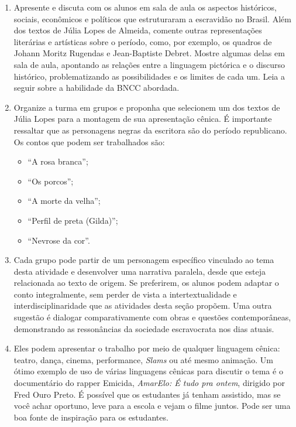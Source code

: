 \documentclass[12pt]{extarticle}
\begin{document}
\begin{enumerate}

\item
Apresente e discuta com os alunos em sala de
aula os aspectos históricos, sociais, econômicos e políticos que
estruturaram a escravidão no Brasil. Além dos textos de Júlia Lopes de
Almeida, comente outras representações literárias e artísticas sobre o
período, como, por exemplo, os quadros de Johann Moritz Rugendas e
Jean-Baptiste Debret. Mostre algumas delas em sala de aula, apontando as
relações entre a linguagem pictórica e o discurso histórico,
problematizando as possibilidades e os limites de cada um.
Leia a seguir sobre a habilidade da BNCC abordada.






\item
Organize a turma em grupos e proponha que selecionem um dos textos de
Júlia Lopes para a montagem de sua apresentação cênica. É importante
ressaltar que as personagens negras da escritora são do período
republicano. Os contos que podem ser trabalhados são:

\begin{itemize}
\item
  ``A rosa branca'';
\item
  ``Os porcos'';
\item
  ``A morte da velha'';
\item
  ``Perfil de preta (Gilda)'';
\item
  ``Nevrose da cor''.
\end{itemize}

\item
Cada grupo pode partir de um personagem específico vinculado ao tema
desta atividade e desenvolver uma narrativa paralela, desde que esteja
relacionada ao texto de origem. Se preferirem, os alunos podem adaptar o
conto integralmente, sem perder de vista a
intertextualidade e interdisciplinaridade que as atividades desta seção
propõem. Uma outra sugestão é dialogar comparativamente com obras e
questões contemporâneas, demonstrando as ressonâncias da sociedade
escravocrata nos dias atuais.

\item
Eles podem apresentar o trabalho por meio de qualquer linguagem
cênica: teatro, dança, cinema, performance, \emph{Slams} ou até mesmo
animação. Um ótimo exemplo de uso de várias linguagens cênicas para
discutir o tema é o documentário do rapper Emicida, \emph{AmarElo: É
tudo pra ontem}, dirigido por Fred Ouro Preto. É possível que os
estudantes já tenham assistido, mas se você achar oportuno, leve para a
escola e vejam o filme juntos. Pode ser uma boa fonte de inspiração para
os estudantes.


\end{enumerate}
\end{document}
